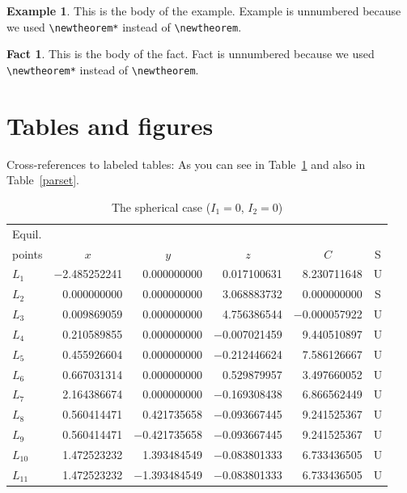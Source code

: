 \documentclass[aoas]{imsart}
\theoremstyle{plain}
\theoremstyle{definition}
\newtheorem*{example}{Example}
\newtheorem*{fact}{Fact}
\begin{document}
\begin{example}
This is the body of the example. Example is unnumbered because we used \verb|\newtheorem*|
instead of \verb|\newtheorem|.
\end{example}

\begin{fact}
This is the body of the fact. Fact is unnumbered because we used \verb|\newtheorem*|
instead of \verb|\newtheorem|.
\end{fact}

\section{Tables and figures}
Cross-references to labeled tables: As you can see in Table~\ref{sphericcase}
and also in Table~\ref{parset}.

\begin{table}
\caption{The spherical case ($I_1=0$, $I_2=0$)}
\label{sphericcase}
\begin{tabular}{@{}lrrrrc@{}}
\hline
Equil. \\
points & \multicolumn{1}{c}{$x$}
& \multicolumn{1}{c}{$y$} & \multicolumn{1}{c}{$z$}
& \multicolumn{1}{c}{$C$} & S \\
\hline
$L_1$    & $-$2.485252241 & 0.000000000  & 0.017100631  & 8.230711648  & U \\
$L_2$    & 0.000000000  & 0.000000000  & 3.068883732  & 0.000000000  & S \\
$L_3$    & 0.009869059  & 0.000000000  & 4.756386544  & $-$0.000057922 & U \\
$L_4$    & 0.210589855  & 0.000000000  & $-$0.007021459 & 9.440510897  & U \\
$L_5$    & 0.455926604  & 0.000000000  & $-$0.212446624 & 7.586126667  & U \\
$L_6$    & 0.667031314  & 0.000000000  & 0.529879957  & 3.497660052  & U \\
$L_7$    & 2.164386674  & 0.000000000  & $-$0.169308438 & 6.866562449  & U \\
$L_8$    & 0.560414471  & 0.421735658  & $-$0.093667445 & 9.241525367  & U \\
$L_9$    & 0.560414471  & $-$0.421735658 & $-$0.093667445 & 9.241525367  & U \\
$L_{10}$ & 1.472523232  & 1.393484549  & $-$0.083801333 & 6.733436505  & U \\
$L_{11}$ & 1.472523232  & $-$1.393484549 & $-$0.083801333 & 6.733436505  & U \\
\hline
\end{tabular}
\end{table}
\end{document}
